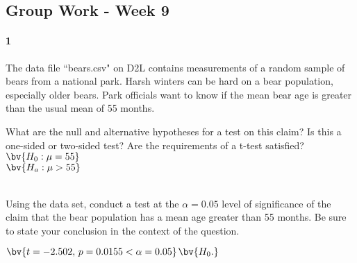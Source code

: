 \documentclass{article}
\begin{document}
\begin{flushleft}
\section*{Group Work - Week 9}

\paragraph{1} The data file ``bears.csv" on D2L contains measurements of a random sample of bears from a national park. Harsh winters can be hard on a bear population, especially older bears. Park officials want to know if the mean bear age is greater than the usual mean of 55 months.

\begin{enumalpha}
\item What are the null and alternative hypotheses for a test on this claim? Is this a one-sided or two-sided test? Are the requirements of a t-test satisfied?\\
\medskip
$\bv{H_0: \mu = 55}$ \\
$\bv{H_a: \mu > 55}$ \\
\\
\vspace{1in}

\item Using the data set, conduct a test at the $\alpha = 0.05$ level of significance of the claim that the bear population has a mean age greater than 55 months. Be sure to state your conclusion in the context of the question.\\
\medskip

$\bv{t = -2.502, \, p = 0.0155 < \alpha =0.05}$$\bv{H_0.}$\\
\vspace{1in}



\end{enumalpha}

\newpage

\end{flushleft}
\end{document}
